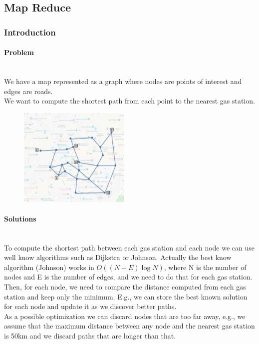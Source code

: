 \documentclass[10pt,a4paper]{article}
\newcommand{\myparagraph}[1]{\paragraph{#1}\mbox{}\\[0.05in]}
\begin{document}
\subsection{Map Reduce}
\subsubsection{Introduction}
\myparagraph{Problem}
We have a map represented as a graph where nodes are points of interest and edges are roads. \\ We want to compute the shortest path from each point to the nearest gas station.
\begin{figure}[h!]
\hfill \includegraphics[width=150pt]{images/gas-stations.png}\hspace*{\fill}
  \label{fig:gas-stations}
\end{figure} 
\myparagraph{Solutions}
To compute the shortest path between each gas station and each node we can use well know algorithms such as Dijkstra or Johnson. Actually the best know algorithm (Johnson) works in $O((N+E)\log{N})$, where N is the number of nodes and E is the number of edges, and we need to do that for each gas station. \\ Then, for each node, we need to compare the distance computed from each gas station and keep only the minimum. E.g., we can store the best known solution for each node and update it as we discover better paths. \\
As a possible optimization we can discard nodes that are too far away, e.g., we assume that the maximum distance between any node and the nearest gas station is 50km and we discard paths that are longer than that.
\end{document}
